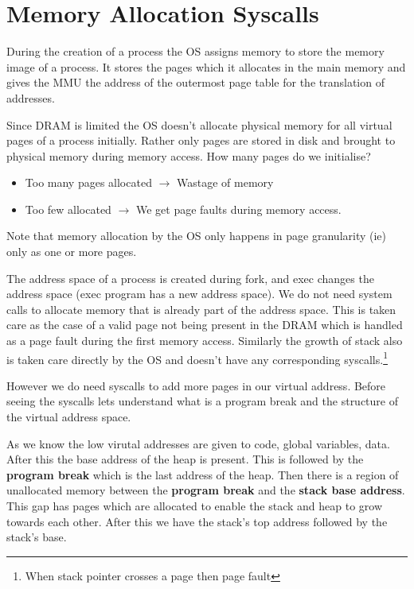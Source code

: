 \documentclass[12pt]{article}
\begin{document}
\section{Memory Allocation Syscalls}
During the creation of a process the OS assigns memory to store the memory image of a process. It stores the pages which it allocates in the main memory
and gives the MMU the address of the outermost page table for the translation of addresses. 

Since DRAM is limited the OS doesn't allocate physical memory for all virtual pages of a process initially. Rather only pages are stored in disk and brought to physical memory during memory access.
How many pages do we initialise? 
\begin{itemize}[topsep=0pt, partopsep=0pt, itemsep=0pt, parsep=0pt]
    \item Too many pages allocated $\rightarrow$ Wastage of memory 
    \item Too few allocated $\rightarrow$ We get page faults during memory access.
\end{itemize}

Note that memory allocation by the OS only happens in page granularity (ie) only as one or more pages.


The address space of a process is created during fork, and exec changes the address space (exec program has a new address space).
We do not need system calls to allocate memory that is already part of the address space. This is taken care as the case of a valid page not 
being present in the DRAM which is handled as a page fault during the first memory access. Similarly the growth of stack also is taken care directly by 
the OS and doesn't have any corresponding syscalls.\footnote {When stack pointer crosses a page then page fault}

However we do need syscalls to add more pages in our virtual address. 
Before seeing the syscalls lets understand what is a program break and the structure of the virtual address space.

As we know the low virutal addresses are given to code, global variables, data.
After this the base address of the heap is present. This is followed by the \textbf{program break} which is the last address of the heap. Then there is a region of unallocated memory
between the \textbf{program break} and the \textbf{stack base address}. This gap has pages which are allocated to enable the stack and heap to grow towards each other. 
After this we have the stack's top address followed by the stack's base. 
\end{document}
